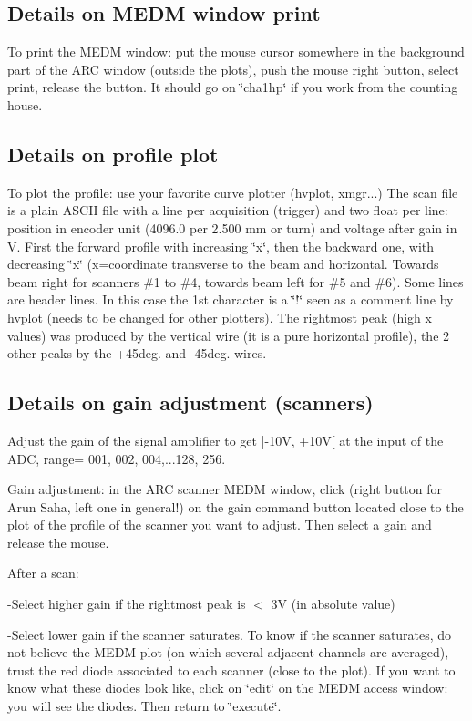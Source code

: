 \subsection{Details on MEDM window print }

To print the MEDM window: put the mouse cursor somewhere in the background part
of the ARC window (outside the plots), push the mouse right button, select print,
release the button. It should go on \char`\"{}cha1hp\char`\"{} if you work from
the counting house. 


\subsection{Details on profile plot }

To plot the profile: use your favorite curve plotter (hvplot, xmgr...) The scan
file is a plain ASCII file with a line per acquisition (trigger) and two float
per line: position in encoder unit (4096.0 per 2.500 mm or turn) and voltage
after gain in V. First the forward profile with increasing \char`\"{}x\char`\"{},
then the backward one, with decreasing \char`\"{}x\char`\"{} (x=coordinate transverse
to the beam and horizontal. Towards beam right for scanners \#1 to \#4, towards
beam left for \#5 and \#6). Some lines are header lines. In this case the 1st
character is a \char`\"{}!\char`\"{} seen as a comment line by hvplot (needs
to be changed for other plotters). The rightmost peak (high x values) was produced
by the vertical wire (it is a pure horizontal profile), the 2 other peaks by
the +45deg. and -45deg. wires. 


\subsection{Details on gain adjustment (scanners) }

Adjust the gain of the signal amplifier to get {]}-10V, +10V{[} at the input
of the ADC, range= 001, 002, 004,...128, 256. 

Gain adjustment: in the ARC scanner MEDM window, click (right
button for Arun Saha,
left one in general!) on the gain command button located close to the plot of
the profile of the scanner you want to adjust. Then select a gain and release
the mouse. 

After a scan: 

-Select higher gain if the rightmost peak is $<$ 3V (in absolute value) 

-Select lower gain if the scanner saturates. To know if the scanner saturates,
do not believe the MEDM plot (on which several adjacent channels are averaged),
trust the red diode associated to each scanner (close to the plot). If you want
to know what these diodes look like, click on \char`\"{}edit\char`\"{} on the
MEDM access window: you will see the diodes. Then return to \char`\"{}execute\char`\"{}. 

